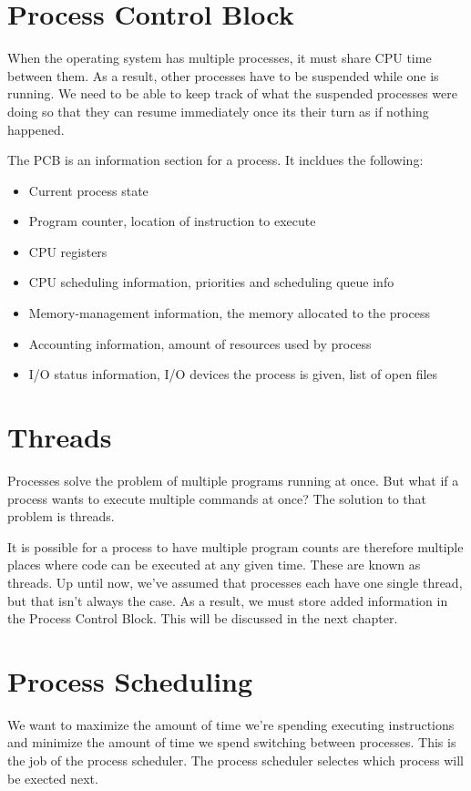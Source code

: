 \documentclass{article}
\begin{document}
\section{Process Control Block}
When the operating system has multiple processes, it must share CPU time
between them. As a result, other processes have to be suspended while one is
running. We need to be able to keep track of what the suspended processes were
doing so that they can resume immediately once its their turn as if nothing
happened.

The PCB is an information section for a process. It incldues the following:

\begin{itemize}
	\item Current process state
	\item Program counter, location of instruction to execute
	\item CPU registers
	\item CPU scheduling information, priorities and scheduling queue info
	\item Memory-management information, the memory allocated to the process
	\item Accounting information, amount of resources used by process
	\item I/O status information, I/O devices the process is given, list of
		open files
\end{itemize}

\section{Threads}
Processes solve the problem of multiple programs running at once. But what if a
process wants to execute multiple commands at once? The solution to that
problem is threads.

It is possible for a process to have multiple program counts are therefore
multiple places where code can be executed at any given time. These are known
as threads. Up until now, we've assumed that processes each have one single
thread, but that isn't always the case. As a result, we must store added
information in the Process Control Block. This will be discussed in the
next chapter.

\section{Process Scheduling}
We want to maximize the amount of time we're spending executing instructions
and minimize the amount of time we spend switching between processes. This is
the job of the process scheduler. The process scheduler selectes which process
will be exected next.
\end{document}
